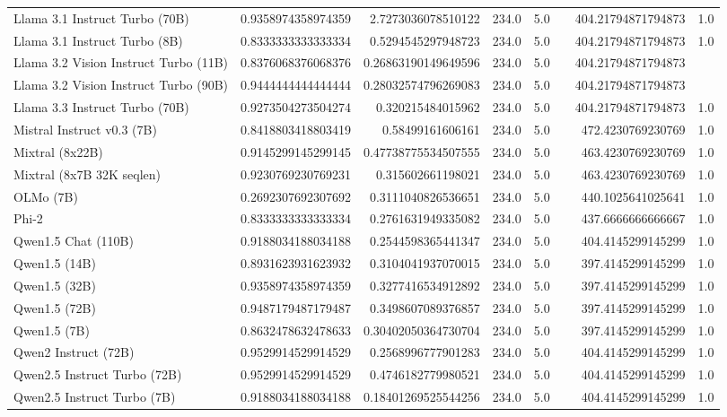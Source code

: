 \begin{table}[htp]
{\begin{tabular}{lrrrrrrr}
Llama 3.1 Instruct Turbo (70B) & 0.9358974358974359 & 2.7273036078510122 & 234.0 & 5.0 &  & 404.21794871794873 & 1.0 \\
Llama 3.1 Instruct Turbo (8B) & 0.8333333333333334 & 0.5294545297948723 & 234.0 & 5.0 &  & 404.21794871794873 & 1.0 \\
Llama 3.2 Vision Instruct Turbo (11B) & 0.8376068376068376 & 0.26863190149649596 & 234.0 & 5.0 &  & 404.21794871794873 &  \\
Llama 3.2 Vision Instruct Turbo (90B) & 0.9444444444444444 & 0.28032574796269083 & 234.0 & 5.0 &  & 404.21794871794873 &  \\
Llama 3.3 Instruct Turbo (70B) & 0.9273504273504274 & 0.320215484015962 & 234.0 & 5.0 &  & 404.21794871794873 & 1.0 \\
Mistral Instruct v0.3 (7B) & 0.8418803418803419 & 0.58499161606161 & 234.0 & 5.0 &  & 472.4230769230769 & 1.0 \\
Mixtral (8x22B) & 0.9145299145299145 & 0.47738775534507555 & 234.0 & 5.0 &  & 463.4230769230769 & 1.0 \\
Mixtral (8x7B 32K seqlen) & 0.9230769230769231 & 0.315602661198021 & 234.0 & 5.0 &  & 463.4230769230769 & 1.0 \\
OLMo (7B) & 0.2692307692307692 & 0.3111040826536651 & 234.0 & 5.0 &  & 440.1025641025641 & 1.0 \\
Phi-2 & 0.8333333333333334 & 0.2761631949335082 & 234.0 & 5.0 &  & 437.6666666666667 & 1.0 \\
Qwen1.5 Chat (110B) & 0.9188034188034188 & 0.2544598365441347 & 234.0 & 5.0 &  & 404.4145299145299 & 1.0 \\
Qwen1.5 (14B) & 0.8931623931623932 & 0.3104041937070015 & 234.0 & 5.0 &  & 397.4145299145299 & 1.0 \\
Qwen1.5 (32B) & 0.9358974358974359 & 0.3277416534912892 & 234.0 & 5.0 &  & 397.4145299145299 & 1.0 \\
Qwen1.5 (72B) & 0.9487179487179487 & 0.3498607089376857 & 234.0 & 5.0 &  & 397.4145299145299 & 1.0 \\
Qwen1.5 (7B) & 0.8632478632478633 & 0.30402050364730704 & 234.0 & 5.0 &  & 397.4145299145299 & 1.0 \\
Qwen2 Instruct (72B) & 0.9529914529914529 & 0.2568996777901283 & 234.0 & 5.0 &  & 404.4145299145299 & 1.0 \\
Qwen2.5 Instruct Turbo (72B) & 0.9529914529914529 & 0.4746182779980521 & 234.0 & 5.0 &  & 404.4145299145299 & 1.0 \\
Qwen2.5 Instruct Turbo (7B) & 0.9188034188034188 & 0.18401269525544256 & 234.0 & 5.0 &  & 404.4145299145299 & 1.0 \\

\end{tabular}}
\end{table}
